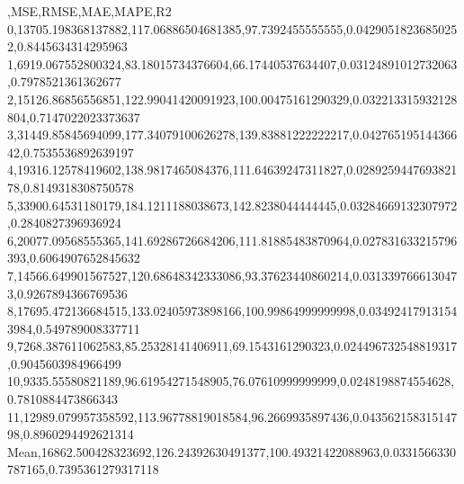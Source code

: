 ,MSE,RMSE,MAE,MAPE,R2
0,13705.198368137882,117.06886504681385,97.7392455555555,0.04290518236850252,0.8445634314295963
1,6919.067552800324,83.18015734376604,66.17440537634407,0.03124891012732063,0.7978521361362677
2,15126.86856556851,122.99041420091923,100.00475161290329,0.032213315932128804,0.7147022023373637
3,31449.85845694099,177.34079100626278,139.83881222222217,0.04276519514436642,0.7535536892639197
4,19316.12578419602,138.9817465084376,111.64639247311827,0.028925944769382178,0.8149318308750578
5,33900.64531180179,184.1211188038673,142.8238044444445,0.03284669132307972,0.2840827396936924
6,20077.09568555365,141.69286726684206,111.81885483870964,0.027831633215796393,0.6064907652845632
7,14566.649901567527,120.68648342333086,93.37623440860214,0.0313397666130473,0.9267894366769536
8,17695.472136684515,133.02405973898166,100.99864999999998,0.034924179131543984,0.549789008337711
9,7268.387611062583,85.25328141406911,69.1543161290323,0.024496732548819317,0.9045603984966499
10,9335.55580821189,96.61954271548905,76.07610999999999,0.0248198874554628,0.7810884473866343
11,12989.079957358592,113.96778819018584,96.2669935897436,0.04356215831514798,0.8960294492621314
Mean,16862.500428323692,126.24392630491377,100.49321422088963,0.0331566330787165,0.7395361279317118
